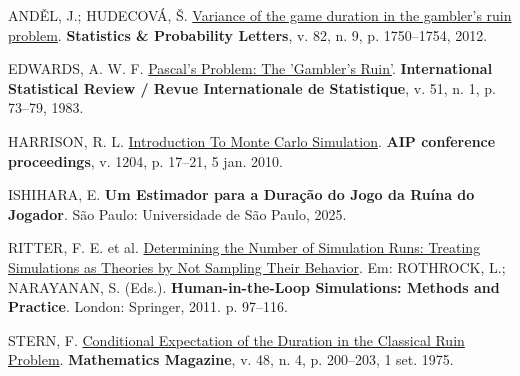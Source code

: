 \documentclass[
  brazilian,
  12pt,
]{article}
\newlength{\cslhangindent}
\newenvironment{CSLReferences}[2] %
 {\begin{list}{}{%
  \setlength{\itemindent}{0pt}
  \setlength{\leftmargin}{0pt}
  \setlength{\parsep}{0pt}
  \ifodd #1
   \setlength{\leftmargin}{\cslhangindent}
   \setlength{\itemindent}{-1\cslhangindent}
  \fi
  \setlength{\itemsep}{#2\baselineskip}}}
 {\end{list}}
\theoremstyle{definition}
\theoremstyle{definition}
\theoremstyle{remark}
\begin{document}
\protect{}\label{refs}
\begin{CSLReferences}{0}{1}
ANDĚL, J.; HUDECOVÁ, Š.
\href{https://doi.org/10.1016/j.spl.2012.05.023}{Variance of the game
duration in the gambler's ruin problem}. \textbf{Statistics \&
Probability Letters}, v. 82, n. 9, p. 1750--1754, 2012.

EDWARDS, A. W. F. \href{https://doi.org/10.2307/1402732}{Pascal's
Problem: The 'Gambler's Ruin'}. \textbf{International Statistical Review
/ Revue Internationale de Statistique}, v. 51, n. 1, p. 73--79, 1983.

HARRISON, R. L. \href{https://doi.org/10.1063/1.3295638}{Introduction To
Monte Carlo Simulation}. \textbf{{AIP} conference proceedings}, v. 1204,
p. 17--21, 5 jan. 2010.

ISHIHARA, E. \textbf{Um Estimador para a Duração do Jogo da Ruína do
Jogador}. São Paulo: Universidade de São Paulo, 2025.

RITTER, F. E. et al.
\href{https://doi.org/10.1007/978-0-85729-883-6_5}{Determining the
Number of Simulation Runs: Treating Simulations as Theories by Not
Sampling Their Behavior}. Em: ROTHROCK, L.; NARAYANAN, S. (Eds.).
\textbf{Human-in-the-Loop Simulations: Methods and Practice}. London:
Springer, 2011. p. 97--116.

STERN, F.
\href{https://doi.org/10.1080/0025570X.1975.11976486}{Conditional
Expectation of the Duration in the Classical Ruin Problem}.
\textbf{Mathematics Magazine}, v. 48, n. 4, p. 200--203, 1 set. 1975.

\end{CSLReferences}
\end{document}
